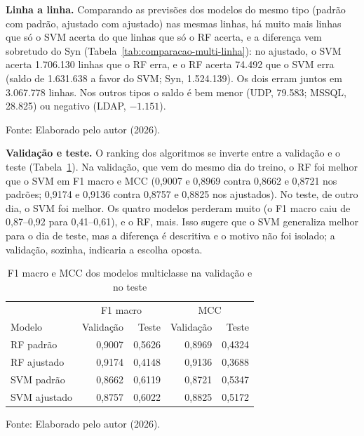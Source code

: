 \documentclass[
    12pt,                %
    openright,           %
    oneside,             %
    a4paper,             %
    english,             %
    brazil               %
]{abntex2}
\begin{document}
\textbf{Linha a linha.} Comparando as previsões dos modelos do mesmo tipo (padrão com padrão, ajustado com ajustado) nas mesmas linhas, há muito mais linhas que só o SVM acerta do que linhas que só o RF acerta, e a diferença vem sobretudo do Syn (Tabela~\ref{tab:comparacao-multi-linha}): no ajustado, o SVM acerta 1.706.130 linhas que o RF erra, e o RF acerta 74.492 que o SVM erra (saldo de 1.631.638 a favor do SVM; Syn, 1.524.139). Os dois erram juntos em 3.067.778 linhas. Nos outros tipos o saldo é bem menor (UDP, 79.583; MSSQL, 28.825) ou negativo (LDAP, $-1.151$).
 
\begin{table}
\centering
\caption{Comparação linha a linha entre SVM e RF do mesmo tipo no teste}
\label{tab:comparacao-multi-linha}
\footnotesize
{}
\par\smallskip
Fonte: Elaborado pelo autor (2026).
\end{table}
 
\textbf{Validação e teste.} O ranking dos algoritmos se inverte entre a validação e o teste (Tabela~\ref{tab:comparacao-multi-validacao-teste}). Na validação, que vem do mesmo dia do treino, o RF foi melhor que o SVM em F1 macro e MCC (0,9007 e 0,8969 contra 0,8662 e 0,8721 nos padrões; 0,9174 e 0,9136 contra 0,8757 e 0,8825 nos ajustados). No teste, de outro dia, o SVM foi melhor. Os quatro modelos perderam muito (o F1 macro caiu de 0,87--0,92 para 0,41--0,61), e o RF, mais. Isso sugere que o SVM generaliza melhor para o dia de teste, mas a diferença é descritiva e o motivo não foi isolado; a validação, sozinha, indicaria a escolha oposta.
 
\begin{table}
\centering
\caption{F1 macro e MCC dos modelos multiclasse na validação e no teste}
\label{tab:comparacao-multi-validacao-teste}
\footnotesize
\begin{tabular}{lrrrr}
\hline
 & \multicolumn{2}{c}{F1 macro} & \multicolumn{2}{c}{MCC} \\
Modelo & Validação & Teste & Validação & Teste \\
\hline
RF padrão    & 0,9007 & 0,5626 & 0,8969 & 0,4324 \\
RF ajustado  & 0,9174 & 0,4148 & 0,9136 & 0,3688 \\
SVM padrão   & 0,8662 & 0,6119 & 0,8721 & 0,5347 \\
SVM ajustado & 0,8757 & 0,6022 & 0,8825 & 0,5172 \\
\hline
\end{tabular}
\par\smallskip
Fonte: Elaborado pelo autor (2026).
\end{table}
 
\end{document}
